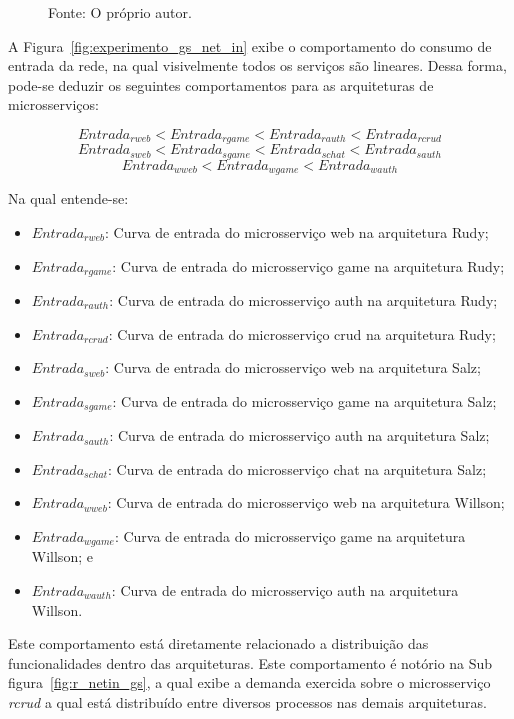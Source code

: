 \begin{figure}[htb!]
    Fonte: O próprio autor.
\end{figure}

A Figura~\ref{fig:experimento_gs_net_in} exibe o comportamento do consumo de entrada da rede, na qual visivelmente todos os serviços são lineares.
%
Dessa forma, pode-se deduzir os seguintes comportamentos para as arquiteturas de microsserviços:

$$
     Entrada_{rweb} < Entrada_{rgame} < Entrada_{rauth} < Entrada_{rcrud}
$$
$$
     Entrada_{sweb} < Entrada_{sgame} < Entrada_{schat} < Entrada_{sauth}
$$
$$
     Entrada_{wweb} < Entrada_{wgame} < Entrada_{wauth}
$$

Na qual entende-se:

\begin{itemize}
 \item $Entrada_{rweb}$: Curva de entrada do microsserviço web na arquitetura Rudy;
 \item $Entrada_{rgame}$: Curva de entrada do microsserviço game na arquitetura Rudy;
 \item $Entrada_{rauth}$: Curva de entrada do microsserviço auth na arquitetura Rudy;
 \item $Entrada_{rcrud}$: Curva de entrada do microsserviço crud na arquitetura Rudy;
  \item $Entrada_{sweb}$: Curva de entrada do microsserviço web na arquitetura Salz;
 \item $Entrada_{sgame}$: Curva de entrada do microsserviço game na arquitetura Salz;
 \item $Entrada_{sauth}$: Curva de entrada do microsserviço auth na arquitetura Salz;
 \item $Entrada_{schat}$: Curva de entrada do microsserviço chat na arquitetura Salz;
 \item $Entrada_{wweb}$: Curva de entrada do microsserviço web na arquitetura Willson;
 \item $Entrada_{wgame}$: Curva de entrada do microsserviço game na arquitetura Willson; e
 \item $Entrada_{wauth}$: Curva de entrada do microsserviço auth na arquitetura Willson.
\end{itemize}


Este comportamento está diretamente relacionado a distribuição das funcionalidades dentro das arquiteturas.
%
Este comportamento é notório na Sub figura~\ref{fig:r_netin_gs}, a qual exibe a demanda exercida sobre o microsserviço \textit{rcrud} a qual está distribuído entre diversos processos nas demais arquiteturas.

